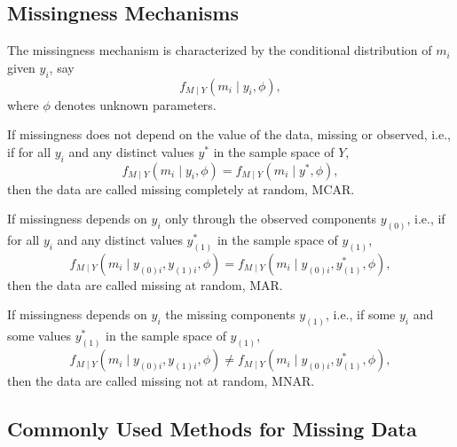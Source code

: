 \subsection{Missingness Mechanisms}

The missingness mechanism is characterized by the conditional distribution of $m_{i}$ given $y_{i}$, say
\begin{equation}
    f_{M\mid Y}\left(m_{i}\mid y_{i},\phi\right),
\end{equation}
where $\phi$ denotes unknown parameters.

\begin{definition}
    If missingness does not depend on the value of the data, missing or observed, i.e., if for all $y_{i}$ and any distinct values $y^{*}$ in the sample space of $Y$,
    \begin{equation}
        f_{M\mid Y}\left(m_{i} \mid y_{i},\phi\right)=f_{M\mid Y}\left(m_{i} \mid y^{*},\phi\right),
    \end{equation}
    then the data are called missing completely at random, MCAR.
\end{definition}

\begin{definition}
    If missingness depends on $y_{i}$ only through the observed components $y_{(0)}$, i.e., if for all $y_{i}$ and any distinct values $y_{(1)}^{*}$ in the sample space of $y_{(1)}$,
    \begin{equation}
        f_{M \mid Y}\left(m_{i}\mid y_{(0)i},y_{(1)i},\phi\right)=f_{M\mid Y}\left(m_{i}\mid y_{(0)i},y_{(1)}^{*},\phi\right),
    \end{equation}
    then the data are called missing at random, MAR.
\end{definition}

\begin{definition}
    If missingness depends on $y_{i}$ the missing components $y_{(1)}$, i.e., if some $y_{i}$ and some values $y_{(1)}^{*}$ in the sample space of $y_{(1)}$,
    \begin{equation}
        f_{M \mid Y}\left(m_{i}\mid y_{(0)i},y_{(1)i},\phi\right)\neq f_{M\mid Y}\left(m_{i}\mid y_{(0)i},y_{(1)}^{*},\phi\right),
    \end{equation}
    then the data are called missing not at random, MNAR.
\end{definition}

\subsection{Commonly Used Methods for Missing Data}

